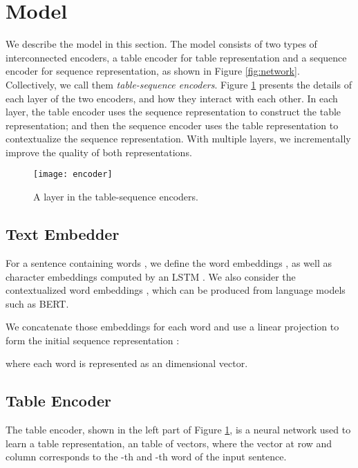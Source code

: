 \documentclass[11pt,a4paper]{article}
\begin{document}
\section{Model}

We describe the model in this section.
The model consists of two types of interconnected encoders, a table encoder for table representation and a sequence encoder for sequence representation, as shown in Figure \ref{fig:network}.
Collectively, we call them {\em table-sequence encoders}.
Figure \ref{fig:encoder} presents the details of each layer of the two encoders, and how they interact with each other.
In each layer, the table encoder uses the sequence representation to construct the table representation;
and then the sequence encoder uses the table representation to contextualize the sequence representation.
With multiple layers, we incrementally improve the quality of both representations.



\begin{figure}[t!]
    \centering
    \texttt{[image: encoder]}
    \caption{A layer in the table-sequence encoders.}
    \label{fig:encoder}
\end{figure}

\subsection{Text Embedder}

For a sentence containing  words , we define the word embeddings , as well as character embeddings  computed by an LSTM \cite{lample2016neural}.
We also consider the contextualized word embeddings , which can be produced from language models such as BERT.

We concatenate those embeddings for each word and use a linear projection to form the initial sequence representation :

where each word is represented as an  dimensional vector.



\subsection{Table Encoder} \label{sec:table}

The table encoder, shown in the left part of Figure \ref{fig:encoder}, is a neural network used to learn a table representation, an  table of vectors, where the vector at row  and column  corresponds to the -th and -th word of the input sentence.
\end{document}
